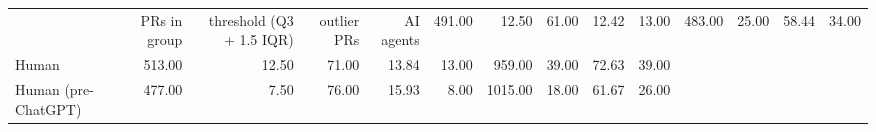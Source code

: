 \begin{tabular}{lrrrrrrrrr}
\toprule
 & PRs in group & threshold (Q3 + 1.5 IQR) & outlier PRs & %
\midrule
AI agents & 491.00 & 12.50 & 61.00 & 12.42 & 13.00 & 483.00 & 25.00 & 58.44 & 34.00 \\
Human & 513.00 & 12.50 & 71.00 & 13.84 & 13.00 & 959.00 & 39.00 & 72.63 & 39.00 \\
Human (pre-ChatGPT) & 477.00 & 7.50 & 76.00 & 15.93 & 8.00 & 1015.00 & 18.00 & 61.67 & 26.00 \\
\bottomrule
\end{tabular}
